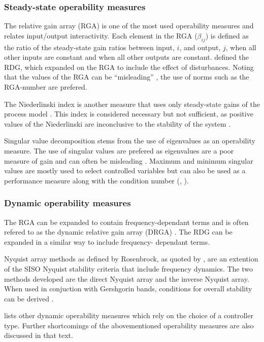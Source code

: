 \subsubsection{Steady-state operability measures}
The relative gain array (RGA) is one of the most used operability measures
\citep[576]{luyben} and relates input/output interactivity. Each element in the
RGA ($\beta_{ij}$) is defined as the ratio of the steady-state gain ratios 
between input, $i$, and output, $j$, when all other inputs are constant and
when all other outputs are constant. \citet{artrdg} defined the RDG, which 
expanded on the RGA to include the effect of disturbances. Noting that the
values of the RGA can be ``misleading'' \citep[87]{skogestad}, the use of norms
such as the RGA-number are prefered.

The Niederlinski index is another measure that uses only steady-state gains of
the process model \citep[572-573]{luyben}. This index is considered necessary
but not sufficient, as positive values of the Niederlinski are inconclusive to
the stability of the system \citep[445]{skogestad}.

Singular value decomposition stems from the use of eigenvalues as an operability
measure. The use of singular values are prefered as eigenvalues are a poor
measure of gain and can often be misleading \citep[75]{skogestad}. Maximum and
minimum singular values are mostly used to select controlled variables but can
also be used as a performance measure along with the condition number
(\citet[596]{luyben}, \citet[80-82]{skogestad}).

\subsubsection{Dynamic operability measures}
The RGA can be expanded to contain frequency-dependant terms and is often
refered to as the dynamic relative gain array (DRGA) \citep[637]{marlin}. The
RDG \citep{artrdg} can be expanded in a similar way to include frequency-
dependant terms.

Nyquist array methods as defined by Rosenbrock, as quoted by 
\citet[92]{skogestad}, are an extention of the SISO Nyquist stability criteria 
that include frequency dynamics. The two methods developed are the direct
Nyquist array and the inverse Nyquist array. When used in conjuction with
Gershgorin bands, conditions for overall stability can be derived
\citep[440]{skogestad}.

\citet{vinsonphd} lists other dynamic operability measures which rely on the 
choice of a controller type. Further shortcomings of the abovementioned 
operability measures are also discussed in that text. 

